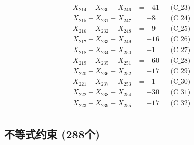 \documentclass[a4paper,10pt]{article}
\begin{document}
{\begin{align}
X_{214} + X_{230} + X_{246} &= +41 && \text{(C\_23)} \\
X_{215} + X_{231} + X_{247} &= +8 && \text{(C\_24)} \\
X_{216} + X_{232} + X_{248} &= +9 && \text{(C\_25)} \\
\allowbreak
X_{217} + X_{233} + X_{249} &= +16 && \text{(C\_26)} \\
X_{218} + X_{234} + X_{250} &= +1 && \text{(C\_27)} \\
X_{219} + X_{235} + X_{251} &= +60 && \text{(C\_28)} \\
X_{220} + X_{236} + X_{252} &= +17 && \text{(C\_29)} \\
X_{221} + X_{237} + X_{253} &= +1 && \text{(C\_30)} \\
\allowbreak
X_{222} + X_{238} + X_{254} &= +30 && \text{(C\_31)} \\
X_{223} + X_{239} + X_{255} &= +17 && \text{(C\_32)} \\
\end{align}
}

\subsection{不等式约束 (288个)}
\end{document}
